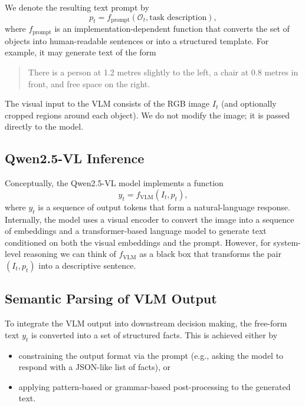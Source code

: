 \documentclass{article}
\begin{document}
We denote the resulting text prompt by
\begin{equation}
    p_t = f_{\text{prompt}}(\mathcal{O}_t, \text{task description}),
\end{equation}
where $f_{\text{prompt}}$ is an implementation-dependent function that converts the set of objects into human-readable sentences or into a structured template. For example, it may generate text of the form
\begin{quote}
    There is a person at 1.2 metres slightly to the left, a chair at 0.8 metres in front, and free space on the right.
\end{quote}

The visual input to the VLM consists of the RGB image $I_t$ (and optionally cropped regions around each object). We do not modify the image; it is passed directly to the model.

\subsection{Qwen2.5-VL Inference}

Conceptually, the Qwen2.5-VL model implements a function
\begin{equation}
    y_t = f_{\text{VLM}}(I_t, p_t),
\end{equation}
where $y_t$ is a sequence of output tokens that form a natural-language response. Internally, the model uses a visual encoder to convert the image into a sequence of embeddings and a transformer-based language model to generate text conditioned on both the visual embeddings and the prompt. However, for system-level reasoning we can think of $f_{\text{VLM}}$ as a black box that transforms the pair $(I_t, p_t)$ into a descriptive sentence.

\subsection{Semantic Parsing of VLM Output}

To integrate the VLM output into downstream decision making, the free-form text $y_t$ is converted into a set of structured facts. This is achieved either by
\begin{itemize}
    \item constraining the output format via the prompt (e.g., asking the model to respond with a JSON-like list of facts), or
    \item applying pattern-based or grammar-based post-processing to the generated text.
\end{itemize}
\end{document}
